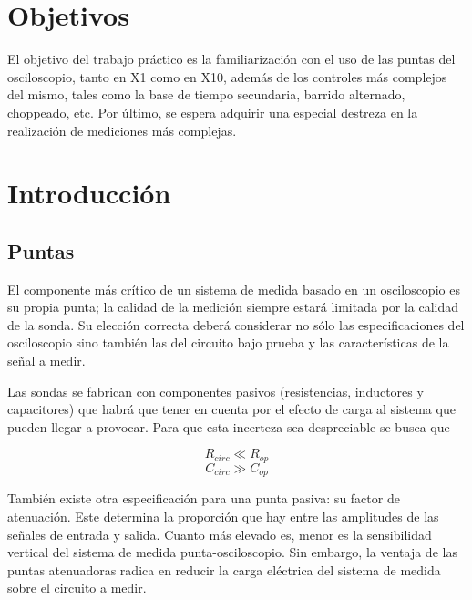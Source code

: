 \documentclass{article}
\begin{document}
\section{Objetivos}

	El objetivo del trabajo práctico es la familiarización con el uso de las puntas del osciloscopio, tanto en X1 como en X10, además de los controles más complejos del mismo, tales como la base de tiempo secundaria, barrido alternado, choppeado, etc. Por último, se espera adquirir una especial destreza en la realización de mediciones más complejas.
\bigskip\bigskip




\section{Introducción}
\medskip

\subsection{Puntas}

	El componente más crítico de un sistema de medida basado en un osciloscopio es su propia punta; la calidad de la medición siempre estará limitada por la calidad de la sonda. Su elección correcta deberá considerar no sólo las especificaciones del osciloscopio sino también  las del circuito bajo prueba y las características de la señal a medir.
	\par
	Las sondas se fabrican con componentes pasivos (resistencias, inductores y capacitores) que habrá que tener en cuenta por el efecto de carga al sistema que pueden llegar a provocar. Para que esta incerteza sea despreciable se busca que

\begin{equation*}
	R_{circ} \ll R_{op}
\end{equation*}
\begin{equation*}
	C_{circ} \gg C_{op}
\end{equation*}
\medskip

	También existe otra especificación para una punta pasiva: su factor de atenuación. Este determina la proporción que hay entre las amplitudes de las señales de entrada y salida. Cuanto más elevado es, menor es la sensibilidad vertical del sistema de medida punta-osciloscopio. Sin embargo, la ventaja de las puntas atenuadoras radica en reducir la carga eléctrica del sistema de medida sobre el circuito a medir.
\bigskip
\end{document}
